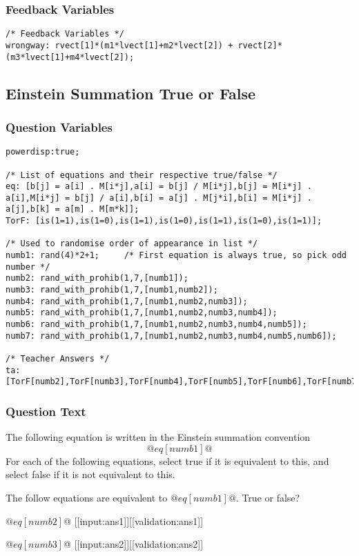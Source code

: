 \documentclass[a4paper,10pt]{article}
\begin{document}
\subsubsection{Feedback Variables}
\begin{lstlisting}
/* Feedback Variables */
wrongway: rvect[1]*(m1*lvect[1]+m2*lvect[2]) + rvect[2]*(m3*lvect[1]+m4*lvect[2]);
\end{lstlisting}

\subsection{Einstein Summation True or False}
\subsubsection{Question Variables}
\begin{lstlisting}
powerdisp:true;

/* List of equations and their respective true/false */
eq: [b[j] = a[i] . M[i*j],a[i] = b[j] / M[i*j],b[j] = M[i*j] . a[i],M[i*j] = b[j] / a[i],b[i] = a[j] . M[j*i],b[i] = M[i*j] . a[j],b[k] = a[m] . M[m*k]];
TorF: [is(1=1),is(1=0),is(1=1),is(1=0),is(1=1),is(1=0),is(1=1)];

/* Used to randomise order of appearance in list */
numb1: rand(4)*2+1;     /* First equation is always true, so pick odd number */
numb2: rand_with_prohib(1,7,[numb1]);
numb3: rand_with_prohib(1,7,[numb1,numb2]);
numb4: rand_with_prohib(1,7,[numb1,numb2,numb3]);
numb5: rand_with_prohib(1,7,[numb1,numb2,numb3,numb4]);
numb6: rand_with_prohib(1,7,[numb1,numb2,numb3,numb4,numb5]);
numb7: rand_with_prohib(1,7,[numb1,numb2,numb3,numb4,numb5,numb6]);

/* Teacher Answers */
ta: [TorF[numb2],TorF[numb3],TorF[numb4],TorF[numb5],TorF[numb6],TorF[numb7]];
\end{lstlisting}
\subsubsection{Question Text}
The following equation is written in the Einstein summation convention \[ @eq[numb1]@ \] For each of the following equations, select true if it is equivalent to this, and select false if it is not equivalent to this.

The follow equations are equivalent to \(@eq[numb1]@\). True or false?

\( @eq[numb2]@ \)   [[input:ans1]][[validation:ans1]]

\( @eq[numb3]@ \)   [[input:ans2]][[validation:ans2]]
\end{document}
